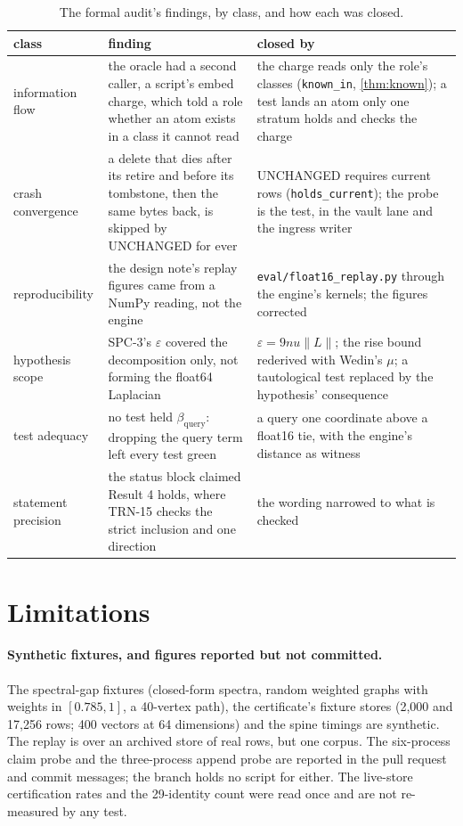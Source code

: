 \documentclass[11pt]{article}
\theoremstyle{plain}
\theoremstyle{definition}
\theoremstyle{remark}
\newcommand{\norm}[1]{\lVert #1 \rVert}
\newcommand{\betaQ}{\beta_{\mathrm{query}}}
\begin{document}
\begin{table}[htbp]
\centering\footnotesize
\caption{The formal audit's findings, by class, and how each was closed.}\label{tab:audit}
\begin{tabular}{p{}p{}p{}}
\toprule
class & finding & closed by \\
\midrule
information flow & the oracle had a second caller, a script's embed charge, which told a role whether an atom exists in a class it cannot read & the charge reads only the role's classes (\texttt{known\_in}, \cref{thm:known}); a test lands an atom only one stratum holds and checks the charge \\
crash convergence & a delete that dies after its retire and before its tombstone, then the same bytes back, is skipped by UNCHANGED for ever & UNCHANGED requires current rows (\texttt{holds\_current}); the probe is the test, in the vault lane and the ingress writer \\
reproducibility & the design note's replay figures came from a NumPy reading, not the engine & \texttt{eval/float16\_replay.py} through the engine's kernels; the figures corrected \\
hypothesis scope & SPC-3's $\varepsilon$ covered the decomposition only, not forming the float64 Laplacian & $\varepsilon = 9nu\norm{L}$; the rise bound rederived with Wedin's $\mu$; a tautological test replaced by the hypothesis' consequence \\
test adequacy & no test held $\betaQ$: dropping the query term left every test green & a query one coordinate above a float16 tie, with the engine's distance as witness \\
statement precision & the status block claimed Result 4 holds, where TRN-15 checks the strict inclusion and one direction & the wording narrowed to what is checked \\
\bottomrule
\end{tabular}
\end{table}

\section{Limitations}

\paragraph{Synthetic fixtures, and figures reported but not committed.} The spectral-gap
fixtures (closed-form spectra, random weighted graphs with weights in $[0.785, 1]$, a 40-vertex
path), the certificate's fixture stores (2,000 and 17,256 rows; 400 vectors at 64 dimensions) and
the spine timings are synthetic. The replay is over an archived store of real rows, but one
corpus. The six-process claim probe and the three-process append probe are reported in the pull
request and commit messages; the branch holds no script for either. The live-store certification
rates and the 29-identity count were read once and are not re-measured by any test.
\end{document}
